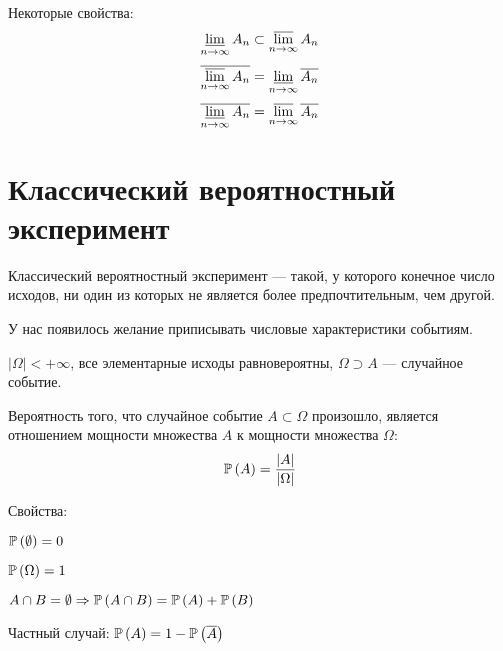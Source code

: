 Некоторые свойства:
$$\varliminf_{n \to \infty} A_n \subset \varlimsup_{n \to \infty} A_n $$
$$\overline{\varlimsup_{n \to \infty} A_n}
= \varliminf_{n \to \infty} \overline{A_n}$$
$$\overline{\varliminf_{n \to \infty} A_n}
= \varlimsup_{n \to \infty} \overline{A_n} $$

\section{Классический вероятностный эксперимент}
\begin{definition}
Классический вероятностный эксперимент --- такой, у которого
конечное число исходов,
ни один из которых не является более предпочтительным, чем другой.
\end{definition}

У нас появилось желание приписывать числовые характеристики событиям.

$\left|\Omega\right| < +\infty$,
все элементарные исходы равновероятны,
$\Omega \supset A$ --- случайное событие.

\begin{definition}[Вероятность]
Вероятность того, что случайное событие $A\subset\Omega$ произошло,
является отношением мощности множества $A$ к мощности множества $\Omega$:
$$\mathbb{P}\left( A \right)=\frac{\left|A\right|}{\left|\Omega\right|}$$

Свойства:

$\mathbb{P}\left( \emptyset \right)=0$

$\mathbb{P}\left( \Omega \right)=1$

$A\cap B=\emptyset \Rightarrow \mathbb{P}\left( A\cap B \right)
=\mathbb{P}\left( A \right)+\mathbb{P}\left( B \right)$

Частный случай:
$\mathbb{P}\left( A \right)=1-\mathbb{P}\left( \overline{A} \right)$
\end{definition}

